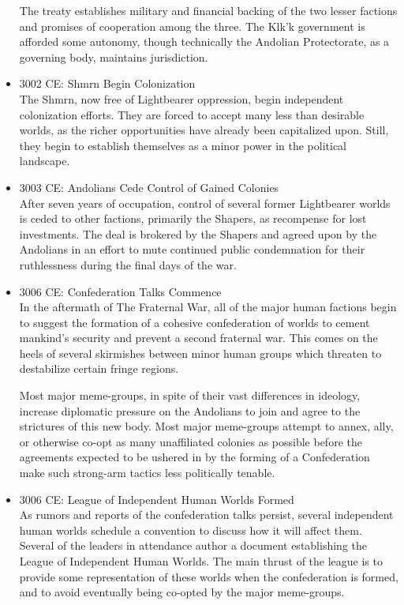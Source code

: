 \begin{itemize}
The treaty establishes military and financial backing of the two
lesser factions and promises of cooperation among the three.  The
Klk'k government is afforded some autonomy, though technically the
Andolian Protectorate, as a governing body, maintains jurisdiction.

\item 3002 CE: Shmrn Begin Colonization \\

The Shmrn, now free of Lightbearer oppression, begin independent
colonization efforts.  They are forced to accept many less than
desirable worlds, as the richer opportunities have already been
capitalized upon.  Still, they begin to establish themselves as a
minor power in the political landscape.


\item 3003 CE: Andolians Cede Control of Gained Colonies \\

After seven years of occupation, control of several former Lightbearer
worlds is ceded to other factions, primarily the Shapers, as
recompense for lost investments.  The deal is brokered by the Shapers
and agreed upon by the Andolians in an effort to mute continued public
condemnation for their ruthlessness during the final days of
the war.

\item 3006 CE: Confederation Talks Commence \\

In the aftermath of The Fraternal War, all of the major human factions
begin to suggest the formation of a cohesive confederation of worlds
to cement mankind's security and prevent a second fraternal war.  This
comes on the heels of several skirmishes between minor human groups
which threaten to destabilize certain fringe regions.

Most major meme-groups, in spite of their vast differences in
ideology, increase diplomatic pressure on the Andolians to join and
agree to the strictures of this new body. Most major meme-groups
attempt to annex, ally, or otherwise co-opt as many unaffiliated
colonies as possible before the agreements expected to be ushered in
by the forming of a Confederation make such strong-arm tactics less
politically tenable.

\item 3006 CE: League of Independent Human Worlds Formed \\

As rumors and reports of the confederation talks persist, several
independent human worlds schedule a convention to discuss how it will
affect them.  Several of the leaders in attendance author a document
establishing the League of Independent Human Worlds.  The main thrust
of the league is to provide some representation of these worlds when
the confederation is formed, and to avoid eventually being co-opted by
the major meme-groups.

\end{itemize}



